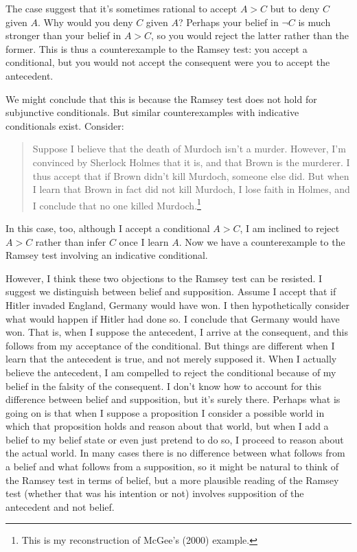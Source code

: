\documentclass[12pt]{article}
\begin{document}
The case suggest that it's sometimes rational to accept $A > C$ but to deny $C$ given $A$. Why would you deny $C$ given $A$? Perhaps your belief in $\neg C$ is much stronger than your belief in $A>C$, so you would reject the latter rather than the former. This is thus a counterexample to the Ramsey test: you accept a conditional, but you would not accept the consequent were you to accept the antecedent.

We might conclude that this is because the Ramsey test does not hold for subjunctive conditionals. But similar counterexamples with indicative conditionals exist. Consider:

\begin{quote}
Suppose I believe that the death of Murdoch isn't a murder. However, I'm convinced by Sherlock Holmes that it is, and that Brown is the murderer. I thus accept that if Brown didn't kill Murdoch, someone else did. But when I learn that Brown in fact did not kill Murdoch, I lose faith in Holmes, and I conclude that no one killed Murdoch.\footnote{This is my reconstruction of McGee's (2000) example.}
\end{quote}

In this case, too, although I accept a conditional $A>C$, I am inclined to reject $A>C$ rather than infer $C$ once I learn $A$. Now we have a counterexample to the Ramsey test involving an indicative conditional.

However, I think these two objections to the Ramsey test can be resisted. I suggest we distinguish between belief and supposition. Assume I accept that if Hitler invaded England, Germany would have won. I then hypothetically consider what would happen if Hitler had done so. I conclude that Germany would have won. That is, when I suppose the antecedent, I arrive at the consequent, and this follows from my acceptance of the conditional. But things are different when I learn that the antecedent is true, and not merely supposed it. When I actually believe the antecedent, I am compelled to reject the conditional because of my belief in the falsity of the consequent. I don't know how to account for this difference between belief and supposition, but it's surely there. Perhaps what is going on is that when I suppose a proposition I consider a possible world in which that proposition holds and reason about that world, but when I add a belief to my belief state or even just pretend to do so, I proceed to reason about the actual world. In many cases there is no difference between what follows from a belief and what follows from a supposition, so it might be natural to think of the Ramsey test in terms of belief, but a more plausible reading of the Ramsey test (whether that was his intention or not) involves supposition of the antecedent and not belief.
\end{document}
